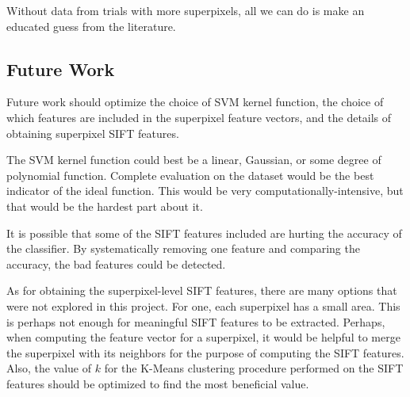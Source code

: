 \documentclass[10pt,twocolumn,letterpaper]{article}
\begin{document}
Without data from trials with more superpixels, all we can do is make an educated guess from the literature.

\subsection{Future Work}

Future work should optimize the choice of SVM kernel function, the choice of which features are included in the superpixel feature vectors, and the details of obtaining superpixel SIFT features.

The SVM kernel function could best be a linear, Gaussian, or some degree of polynomial function.  Complete evaluation on the dataset would be the best indicator of the ideal function.  This would be very computationally-intensive, but that would be the hardest part about it.

It is possible that some of the SIFT features included are hurting the accuracy of the classifier. By systematically removing one feature and comparing the accuracy, the bad features could be detected.

As for obtaining the superpixel-level SIFT features, there are many options that were not explored in this project. For one, each superpixel has a small area. This is perhaps not enough for meaningful SIFT features to be extracted. Perhaps, when computing the feature vector for a superpixel, it would be helpful to merge the superpixel with its neighbors for the purpose of computing the SIFT features.  Also, the value of $k$ for the K-Means clustering procedure performed on the SIFT features should be optimized to find the most beneficial value.


{\small


}
\end{document}
